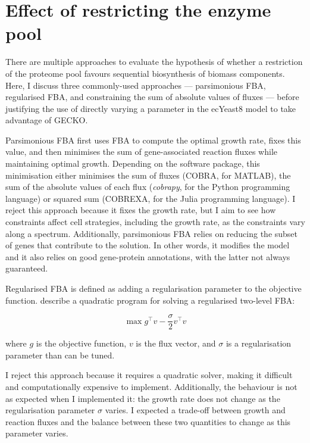 \section{Effect of restricting the enzyme pool}
\label{sec:model-pool}

There are multiple approaches to evaluate the hypothesis of whether a restriction of the proteome pool favours sequential biosynthesis of biomass components.
Here, I discuss three commonly-used approaches --- parsimonious FBA, regularised FBA, and constraining the sum of absolute values of fluxes --- before justifying the use of directly varying a parameter in the ecYeast8 model to take advantage of GECKO.

Parsimonious FBA \parencite{lewisOmicDataEvolved2010} first uses FBA to compute the optimal growth rate, fixes this value, and then minimises the sum of gene-associated reaction fluxes while maintaining optimal growth.
Depending on the software package, this minimisation either minimises the sum of fluxes (COBRA, for MATLAB), the sum of the absolute values of each flux (\textit{cobrapy}, for the Python programming language) or squared sum (COBREXA, for the Julia programming language).
I reject this approach because it fixes the growth rate, but I aim to see how constraints affect cell strategies, including the growth rate, as the constraints vary along a spectrum.
Additionally, parsimonious FBA relies on reducing the subset of genes that contribute to the solution.
In other words, it modifies the model and it also relies on good gene-protein annotations, with the latter not always guaranteed.

Regularised FBA is defined as adding a regularisation parameter to the objective function.
\textcite{vijayakumarHybridFluxBalance2020} describe a quadratic program for solving a regularised two-level FBA:

\begin{equation}
  \max g^\intercal v - \frac{\sigma}{2}v^\intercal v
  \label{eq:model-regularised-fba}
\end{equation}

where $g$ is the objective function, $v$ is the flux vector, and $\sigma$ is a regularisation parameter than can be tuned.

I reject this approach because it requires a quadratic solver, making it difficult and computationally expensive to implement.
Additionally, the behaviour is not as expected when I implemented it: the growth rate does not change as the regularisation parameter $\sigma$ varies.
I expected a trade-off between growth and reaction fluxes and the balance between these two quantities to change as this parameter varies.

